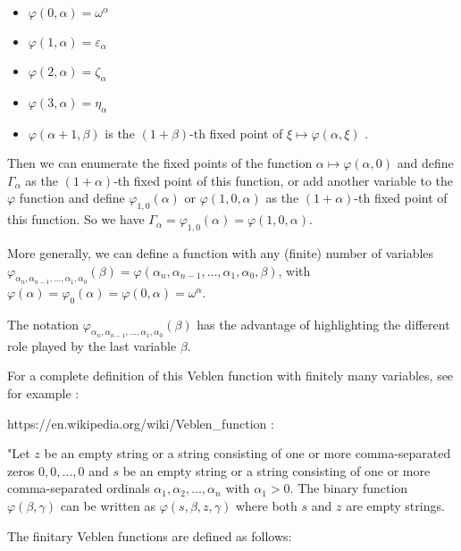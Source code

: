 \documentclass[10pt]{article}
\begin{document}
\begin{itemize}
     \setlength{\itemsep}{1pt}
     \setlength{\parskip}{0pt}
     \setlength{\parsep}{0pt}
\item \( \varphi(0,\alpha) = \omega^\alpha \)
\item \( \varphi(1,\alpha) = \varepsilon_\alpha \)
\item \( \varphi(2,\alpha) = \zeta_\alpha \)
\item \( \varphi(3,\alpha) = \eta_\alpha \)
\item \( \varphi(\alpha+1,\beta) \) is the \( (1+\beta) \)-th fixed point of \( \xi \mapsto \varphi(\alpha,\xi) \) .
\end{itemize}

Then we can enumerate the fixed points of the function \( \alpha \mapsto \varphi(\alpha,0) \) and define \( \Gamma_\alpha \) as the \( (1+\alpha) \)-th fixed point of this function, or add another variable to the \( \varphi \) function 
and define \( \varphi_{1,0}(\alpha) \) or \( \varphi(1,0,\alpha) \) as the \( (1+\alpha) \)-th fixed point of this function. So we have \( \Gamma_\alpha = \varphi_{1,0}(\alpha) = \varphi(1,0,\alpha) \).

More generally, we can define a function with any (finite) number of variables \( \varphi_{\alpha_n,\alpha_{n-1},\ldots,\alpha_1,\alpha_0}(\beta) = \varphi(\alpha_n, \alpha_{n-1}, \ldots, \alpha_1, \alpha_0, \beta) \), with \( \varphi(\alpha) = \varphi_0(\alpha) = \varphi(0,\alpha) = \omega^\alpha \). 

The notation \( \varphi_{\alpha_n,\alpha_{n-1},\ldots,\alpha_1,\alpha_0}(\beta) \) has the advantage of highlighting the different role played by the last variable \( \beta \).

\bigskip

For a complete definition of this Veblen function with finitely many variables, see for example :

https://en.wikipedia.org/wiki/Veblen\_function :

"Let \(z\) be an empty string or a string consisting of one or more comma-separated zeros \(0,0,...,0\) and \(s\) be an empty string or a string consisting of one or more comma-separated ordinals \(\alpha _{1},\alpha _{2},...,\alpha _{n}\) with \(\alpha _{1}>0\). The binary function \(\varphi (\beta ,\gamma )\) can be written as \(\varphi (s,\beta ,z,\gamma )\) where both \(s\) and \(z\) are empty strings.

The finitary Veblen functions are defined as follows:
\end{document}
